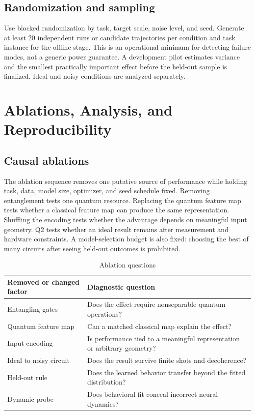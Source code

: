 \documentclass[conference]{IEEEtran}
\begin{document}
\subsection{Randomization and sampling}

Use blocked randomization by task, target scale, noise level, and seed. Generate at least
20 independent runs or candidate trajectories per condition and task instance for the
offline stage. This is an operational minimum for detecting failure modes, not a generic
power guarantee. A development pilot estimates variance and the smallest practically
important effect before the held-out sample is finalized. Ideal and noisy conditions
are analyzed separately.

\section{Ablations, Analysis, and Reproducibility}
\label{sec:analysis}

\subsection{Causal ablations}

The ablation sequence removes one putative source of performance while holding task,
data, model size, optimizer, and seed schedule fixed. Removing entanglement tests one
quantum resource. Replacing the quantum feature map tests whether a classical feature
map can produce the same representation. Shuffling the encoding tests whether the
advantage depends on meaningful input geometry. Q2 tests whether an ideal result remains
after measurement and hardware constraints. A model-selection budget is also fixed:
choosing the best of many circuits after seeing held-out outcomes is prohibited.

\begin{table}[t]
\caption{Ablation questions}
\label{tab:ablations}
\centering
\footnotesize
\begin{tabular}{p{}p{}}
\hline
Removed or changed factor & Diagnostic question \\
\hline
Entangling gates & Does the effect require nonseparable quantum operations? \\
Quantum feature map & Can a matched classical map explain the effect? \\
Input encoding & Is performance tied to a meaningful representation or arbitrary geometry? \\
Ideal to noisy circuit & Does the result survive finite shots and decoherence? \\
Held-out rule & Does the learned behavior transfer beyond the fitted distribution? \\
Dynamic probe & Does behavioral fit conceal incorrect neural dynamics? \\
\hline
\end{tabular}
\end{table}
\end{document}
